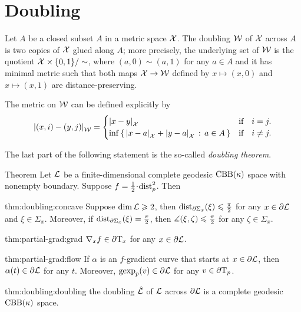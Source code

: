 \section{Doubling}

Let $A$ be a closed subset $A$ in a metric space $\mathcal{X}$.
The doubling $\mathcal{W}$ of $\mathcal{X}$ across $A$ is two copies of $\mathcal{X}$ glued along $A$;
more precisely, the underlying set of $\mathcal{W}$ is the quotient $\mathcal{X}\times\{0,1\}/\sim$, where $(a,0)\sim (a,1)$ for any $a\in A$ and it has minimal metric such that both maps $\mathcal{X}\to \mathcal{W}$ defined by $x\mapsto (x,0)$ and $x\mapsto (x,1)$ are distance-preserving.

The metric on $\mathcal{W}$ can be defined explicitly by
\[\dist{(x,i)}{(y,j)}{\spc{W}}=
\begin{cases}
\dist{x}{y}{\spc{X}}&\text{if}\quad i= j.
\\
\inf\set{\dist{x}{a}{\spc{X}}+\dist{y}{a}{\spc{X}}}{a\in A}&\text{if}\quad i\ne j.
\end{cases}
\]

The last part of the following statement is the so-called \emph{doubling theorem}.

\begin{thm}{Theorem}\label{thm:doubling}
Let $\mathcal{L}$ be a finite-dimensional complete geodesic $\mathrm{CBB}(\kappa)$ space with nonempty boundary.
Suppose $f\z=\tfrac12\cdot\distfun_p^2$.
Then

\begin{subthm}{thm:doubling:concave}
Suppose $\operatorname{\rm dim}\nolimits \mathcal{L}\geqslant 2$, then
$\mathrm{dist}_{\partial \Sigma_x}(\xi)\leqslant \tfrac\pi2$ for any $x\in\partial \mathcal{L}$ and $\xi\in \Sigma_x$.
Moreover, if $\mathrm{dist}_{\partial \Sigma_x}(\xi)= \tfrac\pi2$, then $\measuredangle(\xi,\zeta)\leqslant\tfrac\pi2$ for any $\zeta\in \Sigma_x$. 
\end{subthm}

\begin{subthm}{thm:partial-grad:grad}
$\nabla_xf\in \partial\mathrm{T}_x$ for any $x\in\partial \mathcal{L}$.
\end{subthm}

\begin{subthm}{thm:partial-grad:flow}
If $\alpha$ is an $f$-gradient curve that starts at $x\in \partial \mathcal{L}$, then $\alpha(t)\in \partial \mathcal{L}$ for any $t$.
Moreover, $\operatorname{\rm gexp}\nolimits_p(v)\in \partial \mathcal{L}$ for any $v\in\partial\mathrm{T}_p$.
\end{subthm}

\begin{subthm}{thm:doubling:doubling}
the doubling $\hat{\mathcal{L}}$ of $\mathcal{L}$ across $\partial \mathcal{L}$ is a complete geodesic $\mathrm{CBB}(\kappa)$ space.
\end{subthm}

\end{thm}

